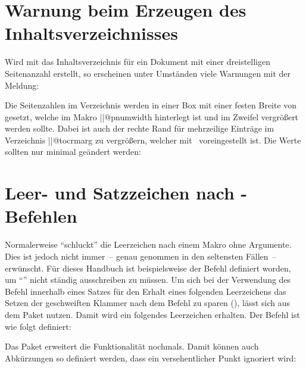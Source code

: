 \section{%
  Warnung beim Erzeugen des Inhaltsverzeichnisses%
}
%
%
Wird mit  das Inhaltsverzeichnis für ein Dokument mit 
einer dreistelligen Seitenanzahl erstellt, so erscheinen unter Umständen viele 
Warnungen mit der Meldung:
%
\begin{quoting}
\end{quoting}
%
Die Seitenzahlen im Verzeichnis werden in einer Box mit einer festen Breite 
von~\PValue{1.55em} gesetzt, welche im Makro \Macro||{@pnumwidth} hinterlegt 
ist und im Zweifel vergrößert werden sollte. Dabei ist auch der rechte Rand für 
%
mehrzeilige Einträge im Verzeichnis \Macro||{@tocrmarg} zu vergrößern, welcher 
mit~\PValue{2.55em} voreingestellt ist. Die Werte sollten nur minimal geändert 
werden:
%
\begin{quoting}
\begin{Code}
\makeatletter
\renewcommand*{\@pnumwidth}{1.9em}\renewcommand*{\@tocrmarg}{2.9em}
\makeatother
\end{Code}
\end{quoting}



\section{%
  Leer- und Satzzeichen nach -Befehlen%
  \label{sec:tips:xspace}%
}
%
Normalerweise \enquote{schluckt}  die Leerzeichen nach einem 
Makro ohne Argumente. Dies ist jedoch nicht immer~-- genau genommen in den 
seltensten Fällen~-- erwünscht. Für dieses Handbuch ist beispielsweise der 
Befehl  definiert worden, um \enquote{\TUD{}} nicht ständig 
ausschreiben zu müssen. Um sich bei der Verwendung des Befehl innerhalb eines 
Satzes für den Erhalt eines folgenden Leerzeichens das Setzen der geschweiften 
Klammer nach dem Befehl zu sparen (), lässt sich 
 aus dem Paket  nutzen. Damit wird ein folgendes 
Leerzeichen erhalten. Der Befehl  ist wie folgt definiert:
%
\begin{quoting}
\begin{Code}
\newcommand*{\TUD}{Technische Universit\"at Dresden\xspace}
\end{Code}
\end{quoting}
%
Das Paket  erweitert die Funktionalität nochmals. Damit 
können auch Abkürzungen so definiert werden, dass ein versehentlicher Punkt 
ignoriert wird:
%
\begin{quoting}
\begin{Code}
\newcommand*{\zB}{z.\,B\xperiod}
\end{Code}
\end{quoting}



